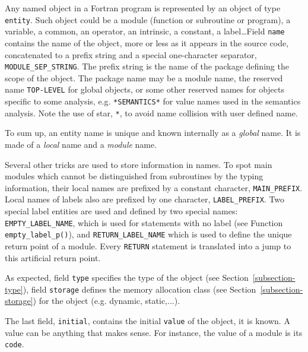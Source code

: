 \documentclass[a4paper]{article}
\begin{document}
Any named object in a Fortran program is represented by an object of
type \texttt{entity}. Such object could be a module (function or subroutine
or program), a variable, a common, an operator, an
intrinsic, a constant, a label\ldots Field \texttt{name}
contains the name of the object, more or less as it appears in the
source code, concatenated to a prefix string and a special one-character
separator, \verb/MODULE_SEP_STRING/.  The prefix string is the name of
the package defining the scope of the object. The package name may be a
module name, the reserved name \texttt{TOP-LEVEL} for global objects, or
some other reserved names for objects specific to some analysis,
e.g. \verb+*SEMANTICS*+ for value names used in the semantics
analysis. Note the use of star, \verb+*+, to avoid name collision with
user defined name.

To sum up, an entity name is unique and known internally as a 
\emph{global} name. It is made of a \emph{local} name and a \emph{module} name.

Several other tricks are used to store information in names. To spot
main modules which cannot be distinguished from subroutines by the
typing information, their local names are prefixed by a constant
character, \verb/MAIN_PREFIX/. Local names of labels also
are prefixed by one character, \verb/LABEL_PREFIX/. Two special label
entities are used and defined by two special names: 
\verb/EMPTY_LABEL_NAME/, which is used for statements with no label (see
Function \texttt{empty\_label\_p()}), and
\verb/RETURN_LABEL_NAME/ which is used to define the unique return point
of a module. Every \texttt{RETURN} statement is translated into a jump to
this artificial return point.

As expected, field \texttt{type} specifies the type of the object (see
Section~\ref{subsection-type}), field \texttt{storage} defines the memory
allocation class (see Section~\ref{subsection-storage}) for the object
(e.g. dynamic, static,...).

The last field, \texttt{initial}, contains the initial \texttt{value} of the
object, it is known. A value can be anything that makes sense. For
instance, the value of a module is its \texttt{code}.

\begin{comment}
Tout objet ayant un nom dans un programme Fortran est repr�sent� par
une \verb/entity/. Un tel objet peut �tre un module, une variable, un
common, un op�rateur, une constante, un label, etc... Pour chaque objet,
le sous-domaine \verb/name/ de l'entit� donne le nom de l'objet tel
qu'il appara�t dans le texte source du programme pr�fix� par le nom du
package dans lequel l'entit� est d�clar�e, le sous-domaine
\verb/type/ donne le type de l'entit�, le sous-domaine \verb/storage/
le genre d'allocation m�moire utilis� pour l'entit�, et finalement,
le sous-domaine \verb/initial/ donne la valeur initiale, si elle est
connue, de l'entit�. Le terme valeur initiale a ici un sens assez
large, puisqu'il s'agit par exemple du code pour les entit�s
repr�sentant des modules.
\end{comment}
\end{document}
